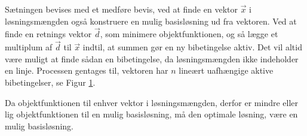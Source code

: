 Sætningen bevises med et medføre bevis, ved at finde en vektor $\vec{x}$ i løsningsmængden også konstruere en mulig basisløsning ud fra vektoren. 
Ved at finde en retnings vektor $\vec{d}$, som minimere objektfunktionen, og så lægge et multiplum af $\vec{d}$ til $\vec{x}$ indtil, at summen gør en ny bibetingelse aktiv. 
Det vil altid være muligt at finde sådan en bibetingelse, da løsningsmængden ikke indeholder en linje.
Processen gentages til, vektoren har $n$ lineært uafhængige aktive bibetingelser, se Figur \ref{fig:eksistens}.
\begin{figure}
\begin{center}
	
	\label{fig:eksistens}
\end{center}
\end{figure}
Da objektfunktionen til enhver vektor i løsningsmængden, derfor er mindre eller lig objektfunktionen til en mulig basisløsning, må den optimale løsning, være en mulig basisløsning.
